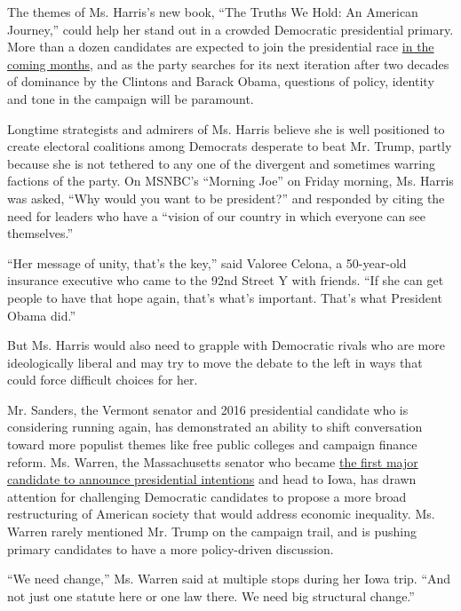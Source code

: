 The themes of Ms. Harris's new book, ``The Truths We Hold: An American
Journey,'' could help her stand out in a crowded Democratic presidential
primary. More than a dozen candidates are expected to join the
presidential race
\href{https://www.nytimes3xbfgragh.onion/2018/12/29/us/politics/2020-democratic-candidates-kamala-elizabeth-warren.html?module=inline}{in
the coming months}, and as the party searches for its next iteration
after two decades of dominance by the Clintons and Barack Obama,
questions of policy, identity and tone in the campaign will be
paramount.

Longtime strategists and admirers of Ms. Harris believe she is well
positioned to create electoral coalitions among Democrats desperate to
beat Mr. Trump, partly because she is not tethered to any one of the
divergent and sometimes warring factions of the party. On MSNBC's
``Morning Joe'' on Friday morning, Ms. Harris was asked, ``Why would you
want to be president?'' and responded by citing the need for leaders who
have a ``vision of our country in which everyone can see themselves.''

``Her message of unity, that's the key,'' said Valoree Celona, a
50-year-old insurance executive who came to the 92nd Street Y with
friends. ``If she can get people to have that hope again, that's what's
important. That's what President Obama did.''

But Ms. Harris would also need to grapple with Democratic rivals who are
more ideologically liberal and may try to move the debate to the left in
ways that could force difficult choices for her.

Mr. Sanders, the Vermont senator and 2016 presidential candidate who is
considering running again, has demonstrated an ability to shift
conversation toward more populist themes like free public colleges and
campaign finance reform. Ms. Warren, the Massachusetts senator who
became
\href{https://www.nytimes3xbfgragh.onion/2018/12/31/us/politics/elizabeth-warren-2020-president-announcement.html}{the
first major candidate to announce presidential intentions} and head to
Iowa, has drawn attention for challenging Democratic candidates to
propose a more broad restructuring of American society that would
address economic inequality. Ms. Warren rarely mentioned Mr. Trump on
the campaign trail, and is pushing primary candidates to have a more
policy-driven discussion.

``We need change,'' Ms. Warren said at multiple stops during her Iowa
trip. ``And not just one statute here or one law there. We need big
structural change.''

